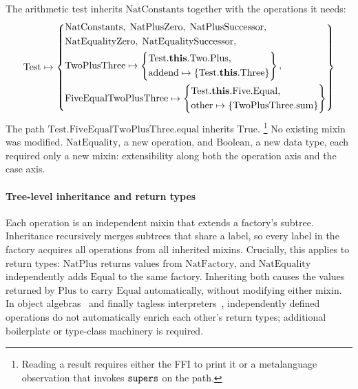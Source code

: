 The arithmetic test inherits $\mathrm{NatConstants}$ together with the operations it needs:
\[
  \mathrm{Test} \mapsto \left\{
    \begin{aligned}
      &\mathrm{NatConstants},\; \mathrm{NatPlusZero},\; \mathrm{NatPlusSuccessor},\\
      &\mathrm{NatEqualityZero},\; \mathrm{NatEqualitySuccessor},\\
      &\mathrm{TwoPlusThree} \mapsto \left\{
        \begin{aligned}
          &\mathrm{Test}.\mathbf{this}.\mathrm{Two}.\mathrm{Plus},\\
          &\mathrm{addend} \mapsto \{\mathrm{Test}.\mathbf{this}.\mathrm{Three}\}
      \end{aligned}\right\},\\
      &\mathrm{FiveEqualTwoPlusThree} \mapsto \left\{
        \begin{aligned}
          &\mathrm{Test}.\mathbf{this}.\mathrm{Five}.\mathrm{Equal},\\
          &\mathrm{other} \mapsto \{\mathrm{TwoPlusThree}.\mathrm{sum}\}
      \end{aligned}\right\}
  \end{aligned}\right\}
\]
The path $\mathrm{Test}.\mathrm{FiveEqualTwoPlusThree}.\mathrm{equal}$
inherits $\mathrm{True}$.%
\footnote{
  Reading a result requires either the FFI to print it or a
  metalanguage observation that invokes $\mathtt{supers}$ on the path.
}
No existing mixin was modified.
$\mathrm{NatEquality}$, a new operation, and $\mathrm{Boolean}$,
a new data type, each required only a new mixin: extensibility along both
the operation axis and the case axis.

\paragraph{Tree-level inheritance and return types}
\label{sec:discussion-expression-problem}
Each operation is an independent mixin that extends a factory's
subtree.
Inheritance recursively merges subtrees that share a label,
so every label in the factory acquires all operations from all
inherited mixins.
Crucially, this applies to return types: $\mathrm{NatPlus}$ returns
values from $\mathrm{NatFactory}$, and $\mathrm{NatEquality}$
independently adds $\mathrm{Equal}$ to the same factory.
Inheriting both causes the values returned by $\mathrm{Plus}$ to
carry $\mathrm{Equal}$ automatically, without modifying either mixin.
In object algebras~\cite{oliveira2012-object-algebras} and finally
tagless interpreters~\cite{carette2009-finally-tagless}, independently defined
operations do not automatically enrich each other's return types;
additional boilerplate or type-class machinery is required.

